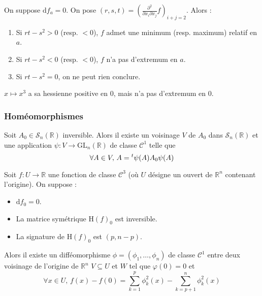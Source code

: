 	\begin{example}
		On suppose $\mathrm{d}f_a = 0$. On pose $(r,s,t) = \left(  \frac{\partial^2}{\partial x_i \partial x_j} f \right)_{i+j=2}$. Alors :
		\begin{enumerate}[label=(\roman*)]
			\item Si $rt-s^2 > 0$ (resp. $< 0$), $f$ admet une minimum (resp. maximum) relatif en $a$.
			\item Si $rt-s^2 < 0$ (resp. $< 0$), $f$ n'a pas d'extremum en $a$.
			\item Si $rt-s^2 = 0$, on ne peut rien conclure.
		\end{enumerate}
	\end{example}
	
	\begin{cexample}
		$x \mapsto x^3$ a sa hessienne positive en $0$, mais n'a pas d'extremum en $0$.
	\end{cexample}
	
	\subsubsection{Homéomorphismes}
	
	
	\begin{lemma}
		Soit $A_0 \in \mathcal{S}_n(\mathbb{R})$ inversible. Alors il existe un voisinage $V$ de $A_0$ dans $\mathcal{S}_n(\mathbb{R})$ et une application $\psi : V \rightarrow \mathrm{GL}_n(\mathbb{R})$ de classe $\mathcal{C}^1$ telle que
		\[ \forall A \in V, \, A = \mathstrut ^t \psi(A) A_0 \psi(A) \]
	\end{lemma}
	
	
	\begin{lemma}[Morse]
		Soit $f : U \rightarrow \mathbb{R}$ une fonction de classe $\mathcal{C}^3$ (où $U$ désigne un ouvert de $\mathbb{R}^n$ contenant l'origine). On suppose :
		\begin{itemize}
			\item $\mathrm{d} f_0 = 0$.
			\item La matrice symétrique $\mathrm{H} (f)_0$ est inversible.
			\item La signature de $\mathrm{H}(f)_0$ est $(p, n-p)$.
		\end{itemize}
		Alors il existe un difféomorphisme $\phi = (\phi_1, \dots, \phi_n)$ de classe $\mathcal{C}^1$ entre deux voisinage de l'origine de $\mathbb{R}^n$ $V \subseteq U$ et $W$ tel que $\varphi(0) = 0$ et
		\[ \forall x \in U, \, f(x) - f(0) = \sum_{k=1}^p \phi_k^2(x) - \sum_{k=p+1}^n \phi_k^2(x) \]
	\end{lemma}
	

